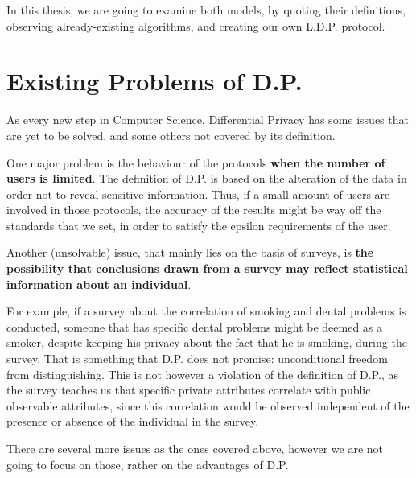 In this thesis, we are going to examine both models, by quoting their definitions, observing already-existing algorithms, and creating our own L.D.P. protocol.

\section{Existing Problems of D.P.}

As every new step in Computer Science, Differential Privacy has some issues that are yet to be solved, and some others not covered by its definition. 

One major problem is the behaviour of the protocols \textbf{when the number of users is limited}. The definition of D.P. is based on the alteration of the data in order not to reveal sensitive information. Thus, if a small amount of users are involved in those protocols, the accuracy of the results might be way off the standards that we set, in order to satisfy the epsilon requirements of the user.

Another (unsolvable) issue, that mainly lies on the basis of surveys, is  \textbf{the possibility that conclusions drawn from a survey may reflect statistical information about an individual}.

For example, if a survey about the correlation of smoking and dental problems is conducted, someone that has specific dental problems might be deemed as a smoker, despite keeping his privacy about the fact that he is smoking, during the survey. That is something that D.P. does not promise: unconditional freedom from distinguishing. This is not however a violation of the definition of D.P., as the survey teaches us that specific private attributes correlate with public observable attributes, since this correlation would be observed independent of the presence or absence of the individual in the survey.

There are several more issues as the ones covered above, however we are not going to focus on those, rather on the advantages of D.P.